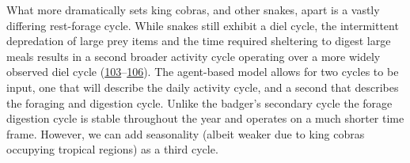 \documentclass[10pt,a4paper]{article}
\newenvironment{Shaded}{}{}
\newcommand{\AttributeTok}[1]{#1}
\newcommand{\CommentTok}[1]{\textit{#1}}
\newcommand{\ConstantTok}[1]{#1}
\newcommand{\DecValTok}[1]{#1}
\newcommand{\FloatTok}[1]{#1}
\newcommand{\FunctionTok}[1]{#1}
\newcommand{\NormalTok}[1]{#1}
\newcommand{\OtherTok}[1]{#1}
\newcommand{\SpecialCharTok}[1]{#1}
\newcommand{\StringTok}[1]{#1}
\begin{document}
\begin{Shaded}
\end{Shaded}

What more dramatically sets king cobras, and other snakes, apart is a vastly differing rest-forage cycle.
While snakes still exhibit a diel cycle, the intermittent depredation of large prey items and the time required sheltering to digest large meals results in a second broader activity cycle operating over a more widely observed diel cycle (\protect\hyperlink{ref-marshall_no_2020}{103}--\protect\hyperlink{ref-Siers2018}{106}).
The agent-based model allows for two cycles to be input, one that will describe the daily activity cycle, and a second that describes the foraging and digestion cycle.
Unlike the badger's secondary cycle the forage digestion cycle is stable throughout the year and operates on a much shorter time frame.
However, we can add seasonality (albeit weaker due to king cobras occupying tropical regions) as a third cycle.
\end{document}
